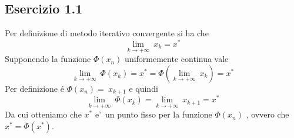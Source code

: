 \subsection{\textbf{Esercizio 1.1}}
Per definizione di metodo iterativo convergente si ha che 
\[
	\lim_{k \to +\infty}\ x_k = x^* 
\]
Supponendo la funzione \( \Phi(x_n) \) uniformemente continua vale
\[ 
	\lim_{k \to +\infty}\ \Phi(x_k) = x^*  = \Phi ( \lim_{k \to +\infty}\ x_k ) = x^* 
\]
Per definizione \'e \( \Phi(x_n) = \ x_{k+1} \) e quindi
\[
	\lim_{k \to +\infty}\ \Phi(x_k) = \lim_{k \to +\infty} \ x_{k+1} = x^*	
\]
Da cui otteniamo che \( x^* \) e'\ un punto fisso per la funzione \( \Phi(x_n) \) , ovvero che \( x^* = \Phi(x^*) \).